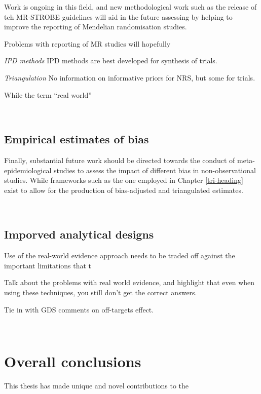 \documentclass[a4paper, twoside]{templates/ociamthesis}
\begin{document}
Work is ongoing in this field, and new methodological work such as the release of teh MR-STROBE guidelines will aid in the future assessing by helping to improve the reporting of Mendelian randomisation studies.

Problems with reporting of MR studies will hopefully

\emph{IPD methods}
IPD methods are best developed for synthesis of trials.

\emph{Triangulation}
No information on informative priors for NRS, but some for trials.

While the term ``real world''

~

\hypertarget{empirical-estimates-of-bias}{%
\subsection{Empirical estimates of bias}\label{empirical-estimates-of-bias}}

Finally, substantial future work should be directed towards the conduct of meta-epidemiological studies to assess the impact of different bias in non-observational studies. While frameworks such as the one employed in Chapter \ref{tri-heading} exist to allow for the production of bias-adjusted and triangulated estimates.

~

\hypertarget{imporved-analytical-designs}{%
\subsection{Imporved analytical designs}\label{imporved-analytical-designs}}

Use of the real-world evidence approach needs to be traded off against the important limitations that t

Talk about the problems with real world evidence, and highlight that even when using these techniques, you still don't get the correct answers.

Tie in with GDS comments on off-targets effect.

~

\hypertarget{overall-conclusions}{%
\section{Overall conclusions}\label{overall-conclusions}}

This thesis has made unique and novel contributions to the
\end{document}
